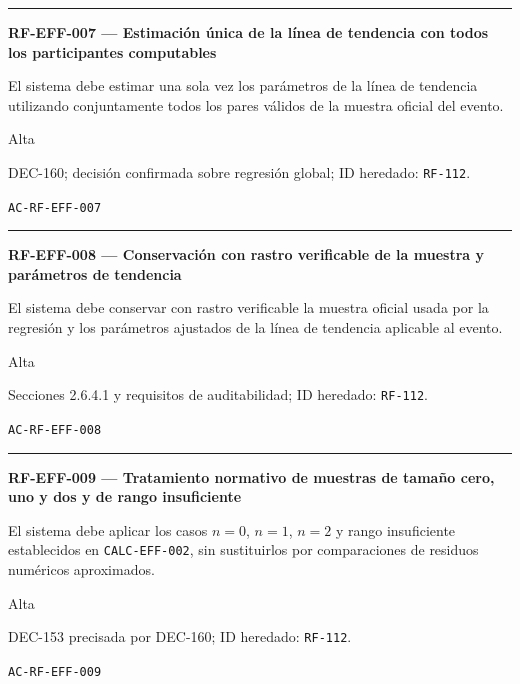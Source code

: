 \documentclass[10pt,letterpaper]{article}
\begin{document}
\vspace{0.25em}\hrule\vspace{0.65em}
\noindent\textbf{RF-EFF-007 --- Estimación única de la línea de tendencia con todos los participantes computables}\par
\begin{description}[style=nextline,leftmargin=3.15cm,labelwidth=2.8cm,font=\normalfont\bfseries]
\item[Obligación] El sistema debe estimar una sola vez los parámetros de la línea de tendencia utilizando conjuntamente todos los pares válidos de la muestra oficial del evento.
\item[Prioridad] Alta
\item[Procedencia] DEC-160; decisión confirmada sobre regresión global; ID heredado: \texttt{RF-112}.
\item[Verificación] \texttt{AC-RF-EFF-007}
\end{description}
\vspace{0.25em}\hrule\vspace{0.65em}
\noindent\textbf{RF-EFF-008 --- Conservación con rastro verificable de la muestra y parámetros de tendencia}\par
\begin{description}[style=nextline,leftmargin=3.15cm,labelwidth=2.8cm,font=\normalfont\bfseries]
\item[Obligación] El sistema debe conservar con rastro verificable la muestra oficial usada por la regresión y los parámetros ajustados de la línea de tendencia aplicable al evento.
\item[Prioridad] Alta
\item[Procedencia] Secciones 2.6.4.1 y requisitos de auditabilidad; ID heredado: \texttt{RF-112}.
\item[Verificación] \texttt{AC-RF-EFF-008}
\end{description}
\vspace{0.25em}\hrule\vspace{0.65em}
\noindent\textbf{RF-EFF-009 --- Tratamiento normativo de muestras de tamaño cero, uno y dos y de rango insuficiente}\par
\begin{description}[style=nextline,leftmargin=3.15cm,labelwidth=2.8cm,font=\normalfont\bfseries]
\item[Obligación] El sistema debe aplicar los casos $n=0$, $n=1$, $n=2$ y rango insuficiente establecidos en \texttt{CALC-EFF-002}, sin sustituirlos por comparaciones de residuos numéricos aproximados.
\item[Prioridad] Alta
\item[Procedencia] DEC-153 precisada por DEC-160; ID heredado: \texttt{RF-112}.
\item[Verificación] \texttt{AC-RF-EFF-009}
\end{description}
\end{document}
